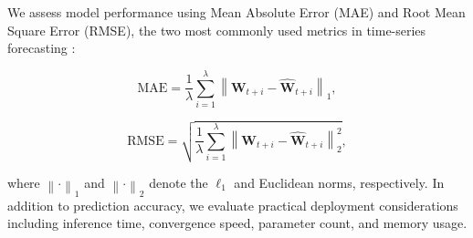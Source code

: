 \documentclass{ieeetmlcn}
\begin{document}
We assess model performance using Mean Absolute Error (MAE) and Root Mean Square Error (RMSE), the two most commonly used metrics in time-series forecasting \cite{acmtimeseriesreview2024}:

\begin{equation}
\label{eq:mae}
\text{MAE} = \frac{1}{\lambda} \sum_{i=1}^{\lambda} \left\| \mathbf{W}_{t+i} - \hat{\mathbf{W}}_{t+i} \right\|_1,
\end{equation}

\begin{equation}
\label{eq:rmse}
\text{RMSE} = \sqrt{ \frac{1}{\lambda} \sum_{i=1}^{\lambda} \left\| \mathbf{W}_{t+i} - \hat{\mathbf{W}}_{t+i} \right\|_2^2 },
\end{equation}

where $\left\| \cdot \right\|_1$ and $\left\| \cdot \right\|_2$ denote the $\ell_1$ and Euclidean norms, respectively. In addition to prediction accuracy, we evaluate practical deployment considerations including inference time, convergence speed, parameter count, and memory usage.
\end{document}
